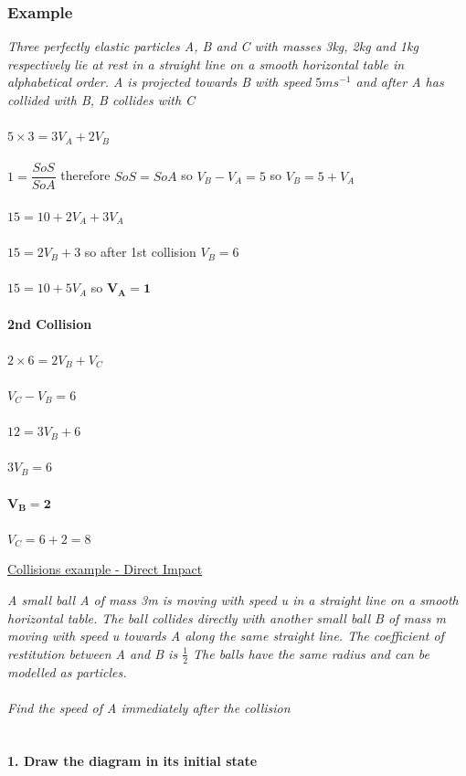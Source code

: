 \documentclass{article}[18pt]
\begin{document}
\subsubsection{Example}
\textit{Three perfectly elastic particles A, B and C with masses 3kg, 2kg and 1kg respectively lie at rest in a straight line on a smooth horizontal table in alphabetical order. A is projected towards B with speed $5ms^{-1}$ and after A has collided with B, B collides with C}\\
\\
$5\times3=3V_A+2V_B$\\
\\
$1=\dfrac{SoS}{SoA}$ therefore $SoS=SoA$ so $V_B-V_A=5$ so $V_B=5+V_A$\\
\\
$15=10+2V_A+3V_A$\\
\\
$15=2V_B+3$ so after 1st collision $V_B=6$\\
\\
$15=10+5V_A$ so $\mathbf{V_A=1}$\\
\\
\textbf{2nd Collision}\\
\\
$2\times6=2V_B+V_C$\\
\\
$V_C-V_B=6$\\
\\
$12=3V_B+6$\\
\\
$3V_B=6$\\
\\
$\mathbf{V_B=2}$\\
\\
$V_C=6+2=8$
\newpage
\begin{center}
\underline{\huge Collisions example - Direct Impact}
\end{center}
\textit{A small ball A of mass 3m is moving with speed u in a straight line on a smooth horizontal
table. The ball collides directly with another small ball B of mass m moving with speed u
towards A along the same straight line. The coefficient of restitution between A and B is $\frac{1}{2}$
The balls have the same radius and can be modelled as particles.}\\
\\
\textit{Find the speed of A immediately after the collision}\\
\\
\\
\textbf{1. Draw the diagram in its initial state}\\
\end{document}
